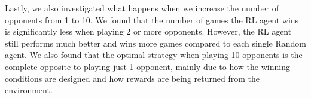 \documentclass[11pt, oneside]{article}   	%
\begin{document}
\hfill

Lastly, we also investigated what happens when we increase the number of opponents from 1 to 10. We found that the number of games the RL agent wins is significantly less when playing 2 or more opponents. However, the RL agent still performs much better and wins more games compared to each single Random agent. We also found that the optimal strategy when playing 10 opponents is the complete opposite to playing just 1 opponent, mainly due to how the winning conditions are designed and how rewards are being returned from the environment.

\nocite{*}


\end{document}

